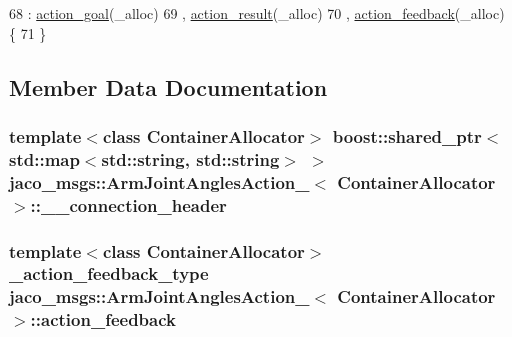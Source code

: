 \begin{DoxyCode}
68     : \hyperlink{structjaco__msgs_1_1ArmJointAnglesAction___ae94e8854432290ab918b68cccf5fd63e}{action\_goal}(\_alloc)
69     , \hyperlink{structjaco__msgs_1_1ArmJointAnglesAction___a8c8fe221e785eaf52c1651021d5cf6e9}{action\_result}(\_alloc)
70     , \hyperlink{structjaco__msgs_1_1ArmJointAnglesAction___a4f8f0bee4654093ead1eb43103cc4d86}{action\_feedback}(\_alloc)  \{
71     \}
\end{DoxyCode}


\subsection{Member Data Documentation}
\subsubsection[{\texorpdfstring{\+\_\+\+\_\+connection\+\_\+header}{__connection_header}}]{\setlength{\rightskip}{0pt plus 5cm}template$<$class Container\+Allocator$>$ boost\+::shared\+\_\+ptr$<$std\+::map$<$std\+::string, std\+::string$>$ $>$ {\bf jaco\+\_\+msgs\+::\+Arm\+Joint\+Angles\+Action\+\_\+}$<$ Container\+Allocator $>$\+::\+\_\+\+\_\+connection\+\_\+header}\hypertarget{structjaco__msgs_1_1ArmJointAnglesAction___a0c3506236c6ab55f1ea4b1bc4b84436a}{}\label{structjaco__msgs_1_1ArmJointAnglesAction___a0c3506236c6ab55f1ea4b1bc4b84436a}
\subsubsection[{\texorpdfstring{action\+\_\+feedback}{action_feedback}}]{\setlength{\rightskip}{0pt plus 5cm}template$<$class Container\+Allocator$>$ {\bf \+\_\+action\+\_\+feedback\+\_\+type} {\bf jaco\+\_\+msgs\+::\+Arm\+Joint\+Angles\+Action\+\_\+}$<$ Container\+Allocator $>$\+::action\+\_\+feedback}\hypertarget{structjaco__msgs_1_1ArmJointAnglesAction___a4f8f0bee4654093ead1eb43103cc4d86}{}\label{structjaco__msgs_1_1ArmJointAnglesAction___a4f8f0bee4654093ead1eb43103cc4d86}
